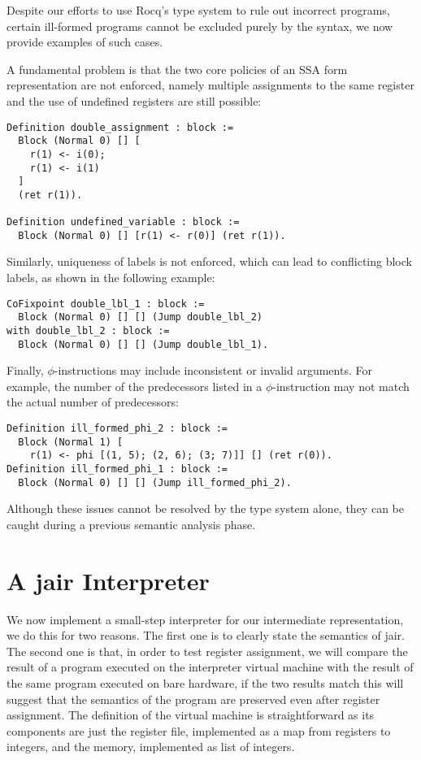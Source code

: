 Despite our efforts to use Rocq's type system to rule out incorrect programs, certain ill-formed programs cannot be excluded purely by the syntax, we now provide examples of such cases.

A fundamental problem is that the two core policies of an SSA form representation are not enforced, namely multiple assignments to the same register and the use of undefined registers are still possible:

\begin{lstlisting}[style=Rocq]
Definition double_assignment : block :=
  Block (Normal 0) [] [
    r(1) <- i(0);
    r(1) <- i(1)
  ]
  (ret r(1)).

Definition undefined_variable : block :=
  Block (Normal 0) [] [r(1) <- r(0)] (ret r(1)).
\end{lstlisting}

Similarly, uniqueness of labels is not enforced, which can lead to conflicting block labels, as shown in the following example:

\begin{lstlisting}[style=Rocq]
CoFixpoint double_lbl_1 : block :=
  Block (Normal 0) [] [] (Jump double_lbl_2)
with double_lbl_2 : block :=
  Block (Normal 0) [] [] (Jump double_lbl_1).
\end{lstlisting}

Finally, $\phi$-instructions may include inconsistent or invalid arguments. For example, the number of the predecessors listed in a $\phi$-instruction may not match the actual number of predecessors:

\begin{lstlisting}[style=Rocq]
Definition ill_formed_phi_2 : block :=
  Block (Normal 1) [
    r(1) <- phi [(1, 5); (2, 6); (3; 7)]] [] (ret r(0)).
Definition ill_formed_phi_1 : block :=
  Block (Normal 0) [] [] (Jump ill_formed_phi_2).
\end{lstlisting}

Although these issues cannot be resolved by the type system alone, they can be caught during a previous semantic analysis phase.

\section{A \gls{jair} Interpreter}
\label{sec:jair-int}

We now implement a small-step interpreter for our intermediate representation, we do this for two reasons.
The first one is to clearly state the semantics of \gls{jair}. The second one is that, in order to test register assignment, we will compare the result of a program executed on the interpreter virtual machine with the result of the same program executed on bare hardware, if the two results match this will suggest that the semantics of the program are preserved even after register assignment.
The definition of the virtual machine is straightforward as its components are just the register file, implemented as a map from registers to integers, and the memory, implemented as list of integers.

